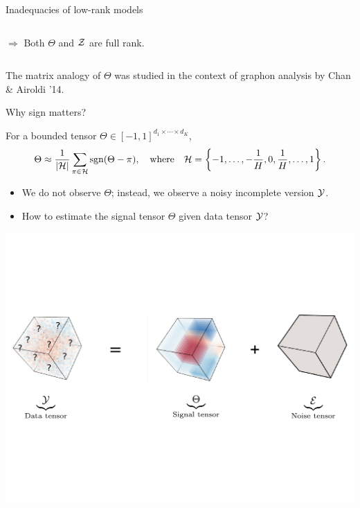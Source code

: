 \documentclass[10pt, mathserif]{beamer} %
\theoremstyle{definition}
\theoremstyle{plain}
\def\sign{\textup{sgn}}
\begin{document}
\begin{frame}{Inadequacies of  low-rank models}
\begin{itemize}
\begin{columns}
\begin{column}{0.6\textwidth}
$\Rightarrow$ Both $\Theta$ and $\mathcal{Z}$ are full rank. 
\end{column}
\end{columns}
    
{\tiny \hfill The matrix analogy of $\Theta$ was studied in the context of graphon analysis by Chan \& Airoldi '14.}
 \end{itemize}
\end{frame}

\begin{frame}{Why sign matters?}

For a bounded tensor $\Theta\in[-1,1]^{d_1\times \cdots \times d_K}$, 
\[
\Theta \approx {1\over |\tH|}\sum_{\pi \in \tH} \sign(\Theta-\pi), \quad \text{where}\quad \tH=\left\{-1,\ldots,-{1\over H}, 0, {1\over H}, \ldots, 1\right\}. 
\]


    \begin{itemize}
        \item We do not observe $\Theta$; instead, we observe a noisy incomplete version $\mathcal{Y}$. 
           \item How to estimate the signal tensor $\Theta$ given data tensor $\mathcal{Y}$?
    \end{itemize}
         \begin{center}
    \includegraphics[width =\textwidth]{Figures/signalnoise.pdf}
    \end{center}
  
\end{frame}
\end{document}
